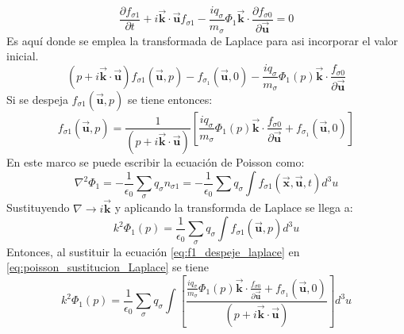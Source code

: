 \documentclass[../tesis_main_file.tex]{subfile}
\begin{document}
\begin{equation}
\frac{\partial f_{\sigma 1}}{\partial t}+ i\overrightarrow{\textbf{k}}\cdot \overrightarrow{\textbf{u}}f_{\sigma 1}-\frac{i q_{\sigma}}{m_{\sigma}}\Phi _1 \overrightarrow{\textbf{k}}\cdot \frac{\partial f_{\sigma 0}}{\partial \overrightarrow{\textbf{u}}}=0
\end{equation}
Es aquí donde se emplea la transformada de Laplace para asi incorporar el valor inicial.
\begin{equation}
(p + i\overrightarrow{\textbf{k}}\cdot \overrightarrow{\textbf{u}})f_{\sigma 1}(\overrightarrow{\textbf{u}},p)- f_{\sigma _1}(\overrightarrow{\textbf{u}},0)-\frac{i q_{\sigma}}{m_{\sigma}}\Phi _1(p)\overrightarrow{\textbf{k}}\cdot \frac{f_{\sigma 0}}{\partial \overrightarrow{\textbf{u}}}
\end{equation}
Si se despeja $f_{\sigma 1}(\overrightarrow{\textbf{u}},p)$ se tiene entonces:
\begin{equation}
\label{eq:f1_despeje_laplace}
f_{\sigma 1}(\overrightarrow{\textbf{u}},p)=\frac{1}{(p + i\overrightarrow{\textbf{k}}\cdot \overrightarrow{\textbf{u}})}\left[\frac{i q_{\sigma}}{m_{\sigma}}\Phi _1(p)\overrightarrow{\textbf{k}}\cdot \frac{f_{\sigma 0}}{\partial \overrightarrow{\textbf{u}}} + f_{\sigma _1}(\overrightarrow{\textbf{u}},0)\right]
\end{equation}
En este marco se puede escribir la ecuación de Poisson como:
\begin{equation}
\nabla ^2 \Phi _1 =- \frac{1}{\epsilon_0}\sum_{\sigma} q_{\sigma}n_{\sigma 1}= - \frac{1}{\epsilon_0}\sum q_{\sigma} \int f_{\sigma 1}(\overrightarrow{\textbf{x}},\overrightarrow{\textbf{u}},t)d^3u
\end{equation}
Sustituyendo $\nabla \rightarrow i \overrightarrow{\textbf{k}}$ y aplicando la transformda de Laplace se llega a:
\begin{equation}
\label{eq:poisson_sustitucion_Laplace}
k^2 \Phi _1(p)=\frac{1}{\epsilon_0} \sum_{\sigma} q_{\sigma}\int f_{\sigma 1}(\overrightarrow{\textbf{u}},p)d^3u
\end{equation}
Entonces, al sustituir la ecuación \ref{eq:f1_despeje_laplace} en \ref{eq:poisson_sustitucion_Laplace} se tiene
\begin{equation}
k^2 \Phi _1(p)=\frac{1}{\epsilon_0}\sum_{\sigma}q_{\sigma}\int \left[\frac{\frac{i q_{\sigma}}{m_{\sigma}}\Phi _1(p)\overrightarrow{\textbf{k}}\cdot \frac{f_{\sigma 0}}{\partial \overrightarrow{\textbf{u}}} + f_{\sigma _1}(\overrightarrow{\textbf{u}},0)}{(p + i\overrightarrow{\textbf{k}}\cdot \overrightarrow{\textbf{u}})}\right]d^3u
\end{equation}
\end{document}
